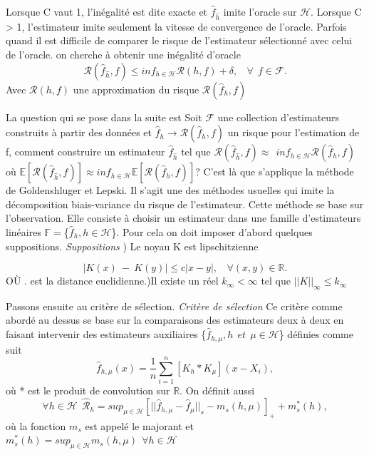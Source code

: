 \documentclass[
]{book}
\begin{document}
\begin{rem}
Lorsque C vaut 1, l'inégalité est dite exacte et $\hat{f}_{\hat{h}}$ imite l'oracle sur $\mathcal{H}$. \newline
Lorsque C > 1, l'estimateur imite seulement la vitesse de convergence de l'oracle.\newline
Parfois quand il est difficile de comparer le risque de l'estimateur sélectionné avec celui de l'oracle. on cherche à obtenir une inégalité d'oracle
$$
\mathcal{R}(\hat{f}_{\hat{h}},f) \leq inf_{h \in \mathcal{H}}\mathcal{R}(h,f)+\delta,~~~~\forall~~f \in \mathcal{F}.
$$
 Avec $\mathcal{R}(h,f)$ une approximation du risque $\mathcal{R}(\hat{f}_{h},f)$ 
\end{rem}

La question qui se pose dans la suite est \newline
Soit \(\mathcal{F}\) une collection d'estimateurs construits à partir des données et \(\hat{f}_h \rightarrow \mathcal{R}(\hat{f}_h,f)\) un risque pour l'estimation de f, comment construire un estimateur \(\hat{f}_{\hat h}\) tel que \(\mathcal{R}(\hat{f}_{\hat h},f) \approx~~inf_{h \in \mathcal{H}} \mathcal{R}(\hat{f}_h,f)\) où \(\mathbb{E}[\mathcal{R}(\hat{f}_{\hat{h}},f)] \approx inf_{h \in \mathcal {H}} \mathbb{E}[\mathcal{R}(\hat{f}_h,f)]\)?
C'est là que s'applique la méthode de Goldenshluger et Lepski. Il s'agit une des méthodes usuelles qui imite la décomposition biais-variance du risque de l'estimateur. \newline
Cette méthode se base sur l'observation. Elle consiste à choisir un estimateur dans une famille d'estimateurs linéaires \(\mathbb{F} =\)\{\(\hat{f}_h,h \in \mathcal{H}\)\}. Pour cela on doit imposer d'abord quelques suppositions. \newline
\emph{Suppositions} ) Le noyau K est lipschitzienne\newline

\[
|K(x)~-~K(y)| \leq c|x-y|,~~~~\forall(x,y)\in \mathbb{R}.
\]
OÙ \textbar.\textbar{} est la distance euclidienne.)Il existe un réel \(k_{\infty}<\infty\) tel que \(||K||_{\infty} \leq k_{\infty}\)

Passons ensuite au critère de sélection.\newline
\emph{Critère de sélection} \newline
Ce critère comme abordé au dessus se base sur la comparaisons des estimateurs deux à deux en faisant intervenir des estimateurs auxiliaires \{\(\hat f_{h,\mu},h~~ et~~ \mu \in \mathcal{H}\)\} définies comme suit
\[
\hat f_{h,\mu}(x)=\frac{1}{n}\sum^n_{i=1}[K_h * K_{\mu}](x-X_i),
\]
où * est le produit de convolution sur \(\mathbb{R}\).\newline
On définit aussi\newline
\[
\forall h \in \mathcal{H}~~\hat{\mathcal R}_h = sup_{\mu \in \mathcal{H}}[||\hat f_{h,\mu}-\hat f_\mu ||_s - m_s(h,\mu)]_+ + m^*_s(h),
\]
où la fonction \(m_s\) est appelé le majorant et \(m^*_s(h) = sup_{\mu \in \mathcal{H}}m_s(h,\mu) ~~ \forall h \in \mathcal{H}\)\newline
\end{document}
